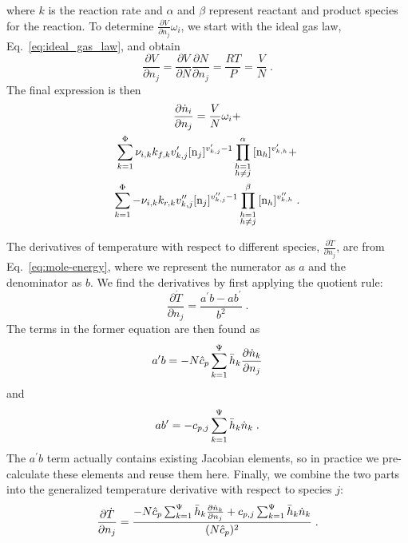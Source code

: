 \documentclass[twocolumn,10pt]{article}
\begin{document}
where $k$ is the reaction rate and $\alpha$ and $\beta$ represent reactant and product species for the reaction.
To determine $\frac{\partial V}{\partial n_j} \omega_i$, we start with the ideal gas law, Eq.~\eqref{eq:ideal_gas_law}, and obtain
\begin{equation}
    \frac{\partial V}{\partial n_j} = \frac{\partial V}{\partial N}\frac{\partial N}{\partial n_j} = \frac{RT}{P} = \frac{V}{N} \;.
\end{equation}
The final expression is then
\begin{multline}
    \frac{\partial \dot{n}_i}{\partial n_j} = \frac{V}{N} \omega_i + \\
    \ReacSum{\nu_{i,k} k_{f,k}{v_{k,j}^\prime} \conc{n_j}^{v_{k,j}^\prime-1}\ReactSpecProd{\conc{n_h}^{v_{k,h}^\prime}}} + \\
    \ReacSum{-\nu_{i,k} k_{r,k}v_{k,j}^{\prime\prime}\conc{n_j}^{v_{k,j}^{\prime\prime}-1}\ProdSpecProd{\conc{n_h}^{v_{k,h}^{\prime\prime}}}} \;.
\end{multline}
%
%

The derivatives of temperature with respect to different species, $\frac{\partial\dot{T}}{\partial n_j}$, are from Eq.~\eqref{eq:mole-energy}, where we represent the numerator as $a$ and the denominator as $b$.
We find the derivatives by first applying the quotient rule:
\begin{equation}
    \frac{\partial \dot{T}}{\partial n_j} = \frac{a^\prime b - ab^\prime}{b^2} \;.
\end{equation}
The terms in the former equation are then found as
\begin{equation}
    a^\prime b = -N\hat{c}_p\sum_{k=1}^{\Psi}{\bar{h}_k \frac{\partial \dot{n}_k}{\partial n_j}}
\end{equation}
and
\begin{equation}
    a b^\prime = -c_{p,j}\sum_{k=1}^{\Psi}{\bar{h}_k \dot{n}_k} \;.
\end{equation}
The $a^\prime b$ term actually contains existing Jacobian elements, so in practice we pre-calculate these elements and reuse them here.
Finally, we combine the two parts into the generalized temperature derivative with respect to species $j$:
\begin{equation}
    \label{eq:temp-species}
    \frac{\partial \dot{T}}{\partial n_j} = \frac{-N\hat{c}_p\sum_{k=1}^{\Psi}{\bar{h}_k \frac{\partial \dot{n}_k}{\partial n_j}} + c_{p,j}\sum_{k=1}^{\Psi}{\bar{h}_k \dot{n}_k}}{(N\hat{c}_p)^2} \;.
\end{equation}
\end{document}
